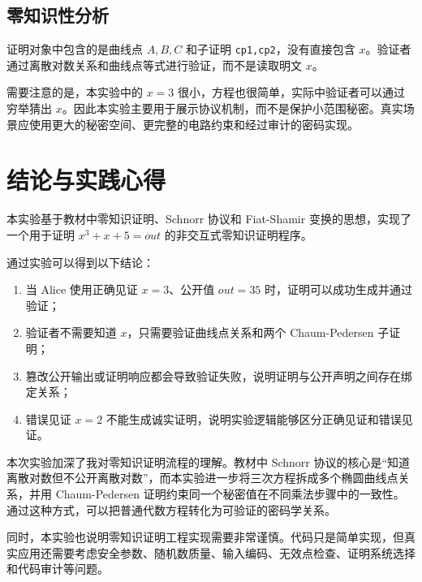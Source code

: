 \documentclass[a4paper]{article}
\begin{document}
	\subsection{零知识性分析}
	证明对象中包含的是曲线点 \(A,B,C\) 和子证明 \texttt{cp1,cp2}，没有直接包含 \(x\)。验证者通过离散对数关系和曲线点等式进行验证，而不是读取明文 \(x\)。
	
	需要注意的是，本实验中的 \(x=3\) 很小，方程也很简单，实际中验证者可以通过穷举猜出 \(x\)。因此本实验主要用于展示协议机制，而不是保护小范围秘密。真实场景应使用更大的秘密空间、更完整的电路约束和经过审计的密码实现。

	\section{结论与实践心得}
	本实验基于教材中零知识证明、Schnorr 协议和 Fiat-Shamir 变换的思想，实现了一个用于证明 \(x^{3}+x+5=out\) 的非交互式零知识证明程序。
	
	通过实验可以得到以下结论：
	\begin{enumerate}
		\item 当 Alice 使用正确见证 \(x=3\)、公开值 \(out=35\) 时，证明可以成功生成并通过验证；
		\item 验证者不需要知道 \(x\)，只需要验证曲线点关系和两个 Chaum-Pedersen 子证明；
		\item 篡改公开输出或证明响应都会导致验证失败，说明证明与公开声明之间存在绑定关系；
		\item 错误见证 \(x=2\) 不能生成诚实证明，说明实验逻辑能够区分正确见证和错误见证。
	\end{enumerate}
	
	本次实验加深了我对零知识证明流程的理解。教材中 Schnorr 协议的核心是“知道离散对数但不公开离散对数”，而本实验进一步将三次方程拆成多个椭圆曲线点关系，并用 Chaum-Pedersen 证明约束同一个秘密值在不同乘法步骤中的一致性。通过这种方式，可以把普通代数方程转化为可验证的密码学关系。
	
	同时，本实验也说明零知识证明工程实现需要非常谨慎。代码只是简单实现，但真实应用还需要考虑安全参数、随机数质量、输入编码、无效点检查、证明系统选择和代码审计等问题。
\end{document}
